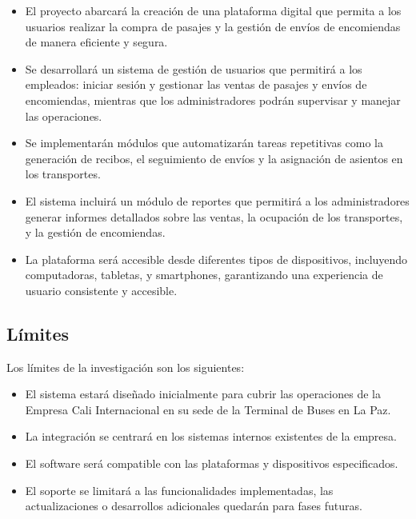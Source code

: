 		\begin{itemize}[label=$\bullet$, left=0cm, labelsep = 1.05cm, topsep = 0pt, parsep = 0pt]
			
			\item El proyecto abarcará la creación de una plataforma digital que permita a los usuarios realizar la compra de pasajes y la gestión de envíos de encomiendas de manera eficiente y segura.
			
			\item Se desarrollará un sistema de gestión de usuarios que permitirá a los empleados: iniciar sesión y gestionar las ventas de pasajes y envíos de encomiendas, mientras que los administradores podrán supervisar y manejar las operaciones.
			
			\item Se implementarán módulos que automatizarán tareas repetitivas como la generación de recibos, el seguimiento de envíos y la asignación de asientos en los transportes.
			
			\item El sistema incluirá un módulo de reportes que permitirá a los administradores generar informes detallados sobre las ventas, la ocupación de los transportes, y la gestión de encomiendas.
			
			\item La plataforma será accesible desde diferentes tipos de dispositivos, incluyendo computadoras, tabletas, y smartphones, garantizando una experiencia de usuario consistente y accesible.
			
		\end{itemize}
		
	\subsection{Límites}
	
		Los límites de la investigación son los siguientes:
		
		\begin{itemize}[label=$\bullet$, left=0cm, labelsep = 1.05cm, topsep = 0pt, parsep = 0pt]
			
			\item El sistema estará diseñado inicialmente para cubrir las operaciones de la Empresa Cali Internacional en su sede de la Terminal de Buses en La Paz.
			
			\item La integración se centrará en los sistemas internos existentes de la empresa. %
			
			\item El software será compatible con las plataformas y dispositivos especificados. %
			
			\item El soporte se limitará a las funcionalidades implementadas, las actualizaciones o desarrollos adicionales quedarán para fases futuras.
			
		\end{itemize}
		
